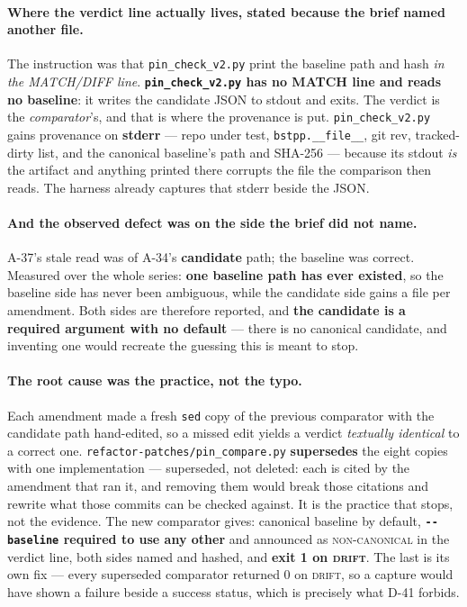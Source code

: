 \documentclass[
  10pt,
]{article}
\begin{document}
\paragraph{Where the verdict line actually lives, stated because the brief named another file.}
The instruction was that \texttt{pin\_check\_v2.py} print the baseline path and hash \emph{in the MATCH/DIFF line}. \textbf{\texttt{pin\_check\_v2.py} has no MATCH line and reads no baseline}: it writes the candidate JSON to stdout and exits. The verdict is the \emph{comparator}'s, and that is where the provenance is put. \texttt{pin\_check\_v2.py} gains provenance on \textbf{stderr} --- repo under test, \texttt{bstpp.\_\_file\_\_}, git rev, tracked-dirty list, and the canonical baseline's path and SHA-256 --- because its stdout \emph{is} the artifact and anything printed there corrupts the file the comparison then reads. The harness already captures that stderr beside the JSON.

\paragraph{And the observed defect was on the side the brief did not name.}
A-37's stale read was of A-34's \textbf{candidate} path; the baseline was correct. Measured over the whole series: \textbf{one baseline path has ever existed}, so the baseline side has never been ambiguous, while the candidate side gains a file per amendment. Both sides are therefore reported, and \textbf{the candidate is a required argument with no default} --- there is no canonical candidate, and inventing one would recreate the guessing this is meant to stop.

\paragraph{The root cause was the practice, not the typo.}
Each amendment made a fresh \texttt{sed} copy of the previous comparator with the candidate path hand-edited, so a missed edit yields a verdict \emph{textually identical} to a correct one. \texttt{refactor-patches/pin\_compare.py} \textbf{supersedes} the eight copies with one implementation --- superseded, not deleted: each is cited by the amendment that ran it, and removing them would break those citations and rewrite what those commits can be checked against. It is the practice that stops, not the evidence. The new comparator gives: canonical baseline by default, \textbf{\texttt{-{}-baseline} required to use any other} and announced as \textsc{non-canonical} in the verdict line, both sides named and hashed, and \textbf{exit 1 on \textsc{drift}}. The last is its own fix --- every superseded comparator returned 0 on \textsc{drift}, so a capture would have shown a failure beside a success status, which is precisely what D-41 forbids.
\end{document}
